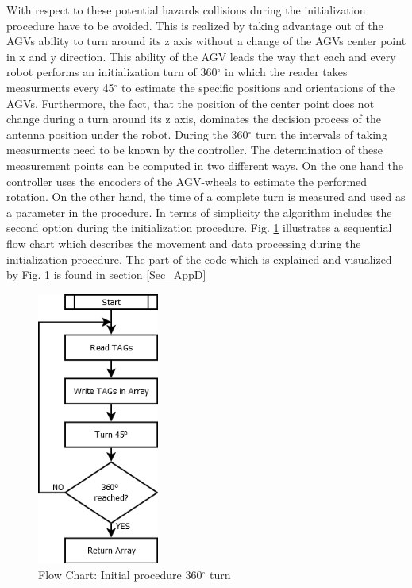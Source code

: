 With respect to these potential hazards collisions during the initialization procedure have to be avoided. This is realized by taking advantage out of the AGVs ability to turn around its z axis without a change of the AGVs center point in x and y direction. This ability of the AGV leads the way that each and every robot performs an initialization turn of 360$^\circ$ in which the reader takes measurments every 45$^\circ$ to estimate the specific positions and orientations of the AGVs. Furthermore, the fact, that the position of the center point does not change during a turn around its z axis, dominates  the decision process of the antenna position under the robot. 
During the 360$^\circ$ turn the intervals of taking measurments need to be known by the controller. The determination of these measurement points can be computed in two different ways. On the one hand the controller uses the encoders of the AGV-wheels to estimate the performed rotation. On the other hand, the time of a complete turn is measured and used as a parameter in the procedure. In terms of simplicity the algorithm includes the second option during the initialization procedure.  
Fig. \ref{SFC_Init_Procedure} illustrates a sequential flow chart which describes the movement and data processing during the initialization procedure. The part of the code which is explained and visualized by Fig. \ref{SFC_Init_Procedure} is found in section \ref{Sec_AppD} \\ 
\begin{figure}[!htbp]
\centering
\includegraphics[width = 4cm]{Pictures/SFC_Init_Procedure}
\caption{Flow Chart: Initial procedure 360$^\circ$ turn}
\label{SFC_Init_Procedure}
\end{figure}\\\\\\\\\\\\\\\\

